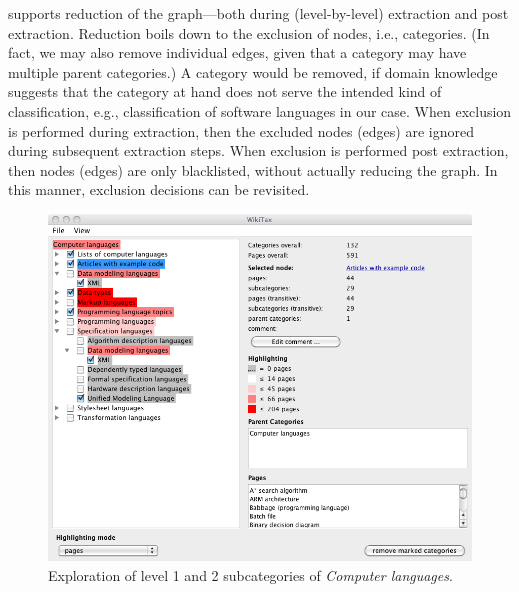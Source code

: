 \WikiTax{} supports reduction of the graph---both during
(level-by-level) extraction and post extraction. Reduction boils down
to the exclusion of nodes, i.e., categories. (In fact, we may also
remove individual edges, given that a category may have multiple
parent categories.)  A category would be removed, if domain knowledge
suggests that the category at hand does not serve the intended kind of
classification, e.g., classification of software languages in our
case. When exclusion is performed during extraction, then the excluded
nodes (edges) are ignored during subsequent extraction steps. When
exclusion is performed post extraction, then nodes (edges) are only
blacklisted, without actually reducing the graph. In this manner,
exclusion decisions can be revisited.


\begin{figure}[t!]
\begin{center}
\includegraphics[width=.98\textwidth]{figures/clLevel12.png}
\end{center}
\vspace{-66\in}
\caption{Exploration of level 1 and 2 subcategories of \emph{Computer languages}.}
\label{F:clLevel12}
\vspace{-42\in}
\end{figure}


\vspace{-27\in}

